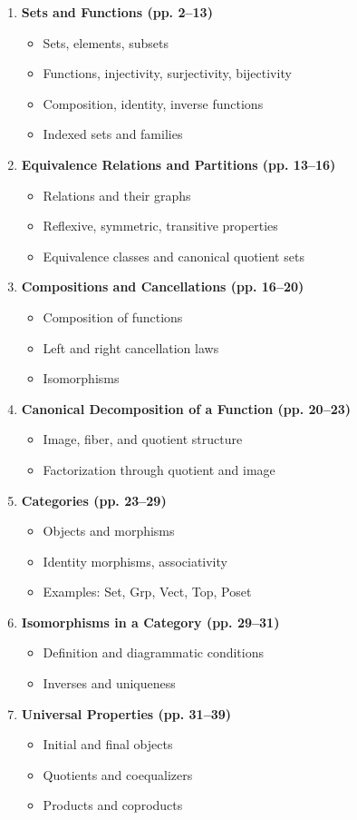 \documentclass[10pt]{article}
\theoremstyle{plain}
\theoremstyle{definition}
\begin{document}
  \begin{enumerate}
  	\item \textbf{Sets and Functions (pp. 2–13)}
  	\begin{itemize}
  		\item Sets, elements, subsets
  		\item Functions, injectivity, surjectivity, bijectivity
  		\item Composition, identity, inverse functions
  		\item Indexed sets and families
  	\end{itemize}
  	\item \textbf{Equivalence Relations and Partitions (pp. 13–16)}
  	\begin{itemize}
  		\item Relations and their graphs
  		\item Reflexive, symmetric, transitive properties
  		\item Equivalence classes and canonical quotient sets
  	\end{itemize}
  	\item \textbf{Compositions and Cancellations (pp. 16–20)}
  	\begin{itemize}
  		\item Composition of functions
  		\item Left and right cancellation laws
  		\item Isomorphisms
  	\end{itemize}
  	\item \textbf{Canonical Decomposition of a Function (pp. 20–23)}
  	\begin{itemize}
  		\item Image, fiber, and quotient structure
  		\item Factorization through quotient and image
  	\end{itemize}
  	\item \textbf{Categories (pp. 23–29)}
  	\begin{itemize}
  		\item Objects and morphisms
  		\item Identity morphisms, associativity
  		\item Examples: Set, Grp, Vect, Top, Poset
  	\end{itemize}
  	\item \textbf{Isomorphisms in a Category (pp. 29–31)}
  	\begin{itemize}
  		\item Definition and diagrammatic conditions
  		\item Inverses and uniqueness
  	\end{itemize}
  	\item \textbf{Universal Properties (pp. 31–39)}
  	\begin{itemize}
  		\item Initial and final objects
  		\item Quotients and coequalizers
  		\item Products and coproducts
  	\end{itemize}
  \end{enumerate}
  
\end{document}
